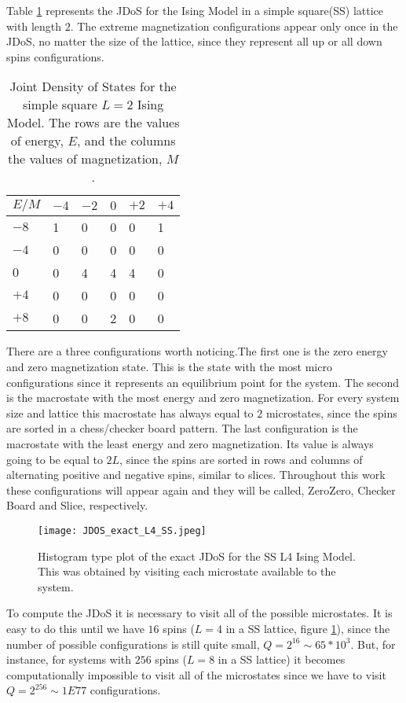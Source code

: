 Table \ref{exact_L2} represents the JDoS for the Ising Model in a simple square(SS) lattice with length $2$. The extreme magnetization configurations appear only once in the JDoS, no matter the size of the lattice, since they represent all up or all down spins configurations. 

\begin{table}[h]
\centering
\caption{Joint Density of States for the simple square $L=2$ Ising Model. The rows are the values of energy, $E$, and the columns the values of magnetization, $M$.}
\label{exact_L2}
\begin{tabular}{l|lllll}
$E/M$ & $-4$ & $-2$ &  $0$ & $+2$ &  $+4$ \\ \hline
$-8$  & 1  & 0  & 0 & 0 & 1 \\
$-4$  & 0  & 0  & 0 & 0 & 0 \\
$0$   & 0  & 4  & 4 & 4 & 0 \\
$+4$   & 0  & 0  & 0 & 0 & 0 \\
$+8$   & 0  & 0  & 2 & 0 & 0
\end{tabular}
\end{table}

There are a three configurations worth noticing.The first one is the zero energy and zero magnetization state. This is the state with the most micro configurations since it represents an equilibrium point for the system. The second is the macrostate with the most energy and zero magnetization. For every system size and lattice this macrostate has always equal to $2$ microstates, since the spins are sorted in a chess/checker board pattern. The last configuration is the macrostate with the least energy and zero magnetization. Its value is always going to be equal to $2L$, since the spins are sorted in rows and columns of alternating positive and negative spins, similar to slices. Throughout this work these configurations will appear again and they will be called, ZeroZero, Checker Board and Slice, respectively. 

\begin{figure}[h]
	\centering
	\texttt{[image: JDOS\_exact\_L4\_SS.jpeg]}
	\caption{Histogram type plot of the exact JDoS for the SS L4 Ising Model. This was obtained by visiting each microstate available to the system.}
	\label{exact_L4}
\end{figure}

To compute the JDoS it is necessary to visit all of the possible microstates. It is easy to do this until we have $16$ spins ($L=4$ in a SS lattice, figure \ref{exact_L4}), since the number of possible configurations is still quite small, $Q = 2^{16}\sim 65*10^3$. But, for instance, for systems with $256$ spins ($L=8$ in a SS lattice) it becomes computationally impossible to visit all of the microstates since we have to visit $Q = 2^{256} \sim 1E77$ configurations. 


